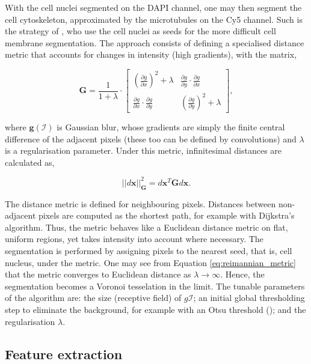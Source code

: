 With the cell nuclei segmented on the DAPI channel, one may then segment the cell cytoskeleton, approximated by the microtubules on the Cy5 channel. Such is the strategy of \cite{jones2005voronoi}, who use the cell nuclei as seeds for the more difficult cell membrane segmentation. The approach consists of defining a specialised distance metric that accounts for changes in intensity (high gradients), with the matrix,

\begin{equation}
\mathbf{G} = \frac{1}{1 + \lambda }\cdot\begin{bmatrix}
(\frac{\partial g}{\partial x})^2 + \lambda & \frac{\partial g}{\partial y}\cdot\frac{\partial g}{\partial x}\\
\frac{\partial g}{\partial x}\cdot\frac{\partial g}{\partial y} & (\frac{\partial g}{\partial y})^2 + \lambda
\end{bmatrix},
\label{eq:reimannian_metric}
\end{equation}

where $\mathbf{g}(\mathcal{I})$ is Gaussian blur, whose gradients are simply the finite central difference of the adjacent pixels (these too can be defined by convolutions) and $\lambda$ is a regularisation parameter. Under this metric, infinitesimal distances are calculated as,

\begin{equation}
||d\mathbf{x}||_{\mathbf{G}}^2 = d\mathbf{x}^T\mathbf{G}d\mathbf{x}.
\label{eq:infinitesimal}
\end{equation}

The distance metric is defined for neighbouring pixels. Distances between non-adjacent pixels are computed as the shortest path, for example with Dijkstra's algorithm. Thus, the metric behaves like a Euclidean distance metric on flat, uniform regions, yet takes intensity into account where necessary. The segmentation is performed by assigning pixels to the nearest seed, that is, cell nucleus, under the metric. One may see from Equation \ref{eq:reimannian_metric} that the metric converges to Euclidean distance as $\lambda \to \infty$. Hence, the segmentation becomes a Voronoi tesselation in the limit. The tunable parameters of the algorithm are: the size (receptive field) of $g\mathcal{I}$; an initial global thresholding step to eliminate the background, for example with an Otsu threshold (\cite{otsu1979threshold}); and the regularisation $\lambda$.

\subsection{Feature extraction}

